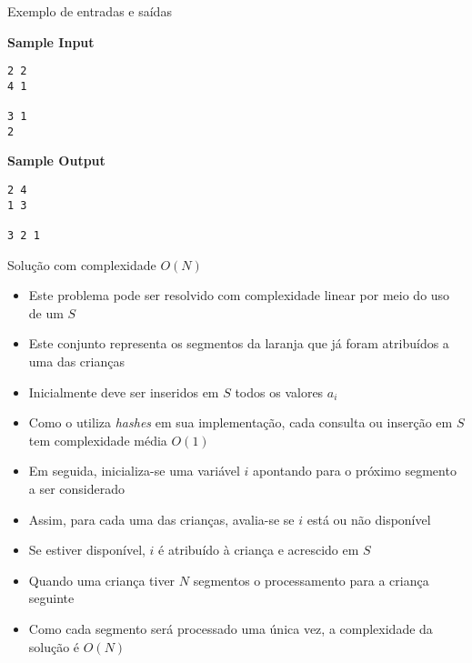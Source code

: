 \begin{frame}[fragile]{Exemplo de entradas e saídas}

\begin{minipage}[t]{0.5\textwidth}
\textbf{Sample Input}
\begin{verbatim}
2 2
4 1

3 1
2
\end{verbatim}
\end{minipage}
\begin{minipage}[t]{0.45\textwidth}
\textbf{Sample Output}
\begin{verbatim}
2 4 
1 3 

3 2 1
\end{verbatim}
\end{minipage}
\end{frame}

\begin{frame}[fragile]{Solução com complexidade $O(N)$}

    \begin{itemize}
        \item Este problema pode ser resolvido com complexidade linear por meio do uso de um
             $S$

        \item Este conjunto representa os segmentos da laranja que já foram atribuídos a uma
            das crianças

        \item Inicialmente deve ser inseridos em $S$ todos os valores $a_i$

        \item Como o  utiliza \textit{hashes} em sua implementação,
            cada consulta ou inserção em $S$ tem complexidade média $O(1)$

        \item Em seguida, inicializa-se uma variável $i$ apontando para o próximo segmento
            a ser considerado

        \item Assim, para cada uma das crianças, avalia-se se $i$ está ou não disponível

        \item Se estiver disponível, $i$ é atribuído à criança e acrescido em $S$

        \item Quando uma criança tiver $N$ segmentos o processamento para a criança seguinte

        \item Como cada segmento será processado uma única vez, a complexidade da solução
            é $O(N)$
   \end{itemize}

\end{frame}

